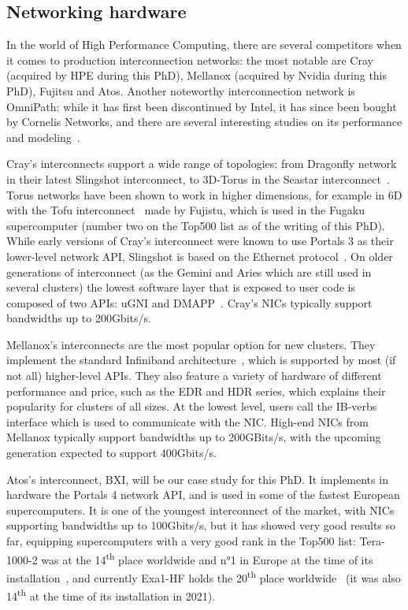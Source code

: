 \subsection{Networking hardware}

In the world of High Performance Computing, there are several competitors when
it comes to production interconnection networks: the most notable are Cray
(acquired by HPE during this PhD), Mellanox (acquired by Nvidia during this
PhD), Fujitsu and Atos. Another noteworthy interconnection network is OmniPath:
while it has first been discontinued by Intel, it has since been bought by
Cornelis Networks, and there are several interesting studies on its performance
and modeling~\cite{Rosales2017}.

Cray's interconnects support a wide range of topologies: from Dragonfly network
in their latest Slingshot interconnect, to 3D-Torus in the Seastar
interconnect~\cite{Brightwell2005}. Torus networks have been shown to work in
higher dimensions, for example in 6D with the Tofu interconnect~\cite{Ajima2009}
made by Fujistu, which is used in the Fugaku supercomputer (number two on the
Top500 list as of the writing of this PhD). While early versions of Cray's
interconnect were known to use Portals 3 as their lower-level network API,
Slingshot is based on the Ethernet protocol~\cite{DeSensi2020}. On older
generations of interconnect (as the Gemini and Aries which are still used in
several clusters) the lowest software layer that is exposed to user code is
composed of two APIs: uGNI and DMAPP~\cite{Cray2010}. Cray's NICs typically
support bandwidths up to 200Gbits/s.

Mellanox's interconnects are the most popular option for new clusters. They
implement the standard Infiniband architecture~\cite{Pfister2001}, which is
supported by most (if not all) higher-level APIs. They also feature a variety of
hardware of different performance and price, such as the EDR and HDR series,
which explains their popularity for clusters of all sizes. At the
lowest level, users call the IB-verbs interface which is used to communicate
with the NIC. High-end NICs from Mellanox typically support bandwidths up to
200GBits/s, with the upcoming generation expected to support 400Gbits/s.

Atos's interconnect, BXI, will be our case study for this PhD. It implements in
hardware the Portals 4 network API, and is used in some of the fastest European
supercomputers. It is one of the youngest interconnect of the market, with NICs
supporting bandwidths up to 100Gbits/s, but it has showed very good results so
far, equipping supercomputers with a very good rank in the Top500 list:
Tera-1000-2 was at the 14\textsuperscript{th} place worldwide and n°1 in Europe
at the time of its installation~\cite{top500_tera1000}, and currently Exa1-HF
holds the 20\textsuperscript{th} place worldwide~\cite{Top500_exa1} (it was also
14\textsuperscript{th} at the time of its installation in 2021).

